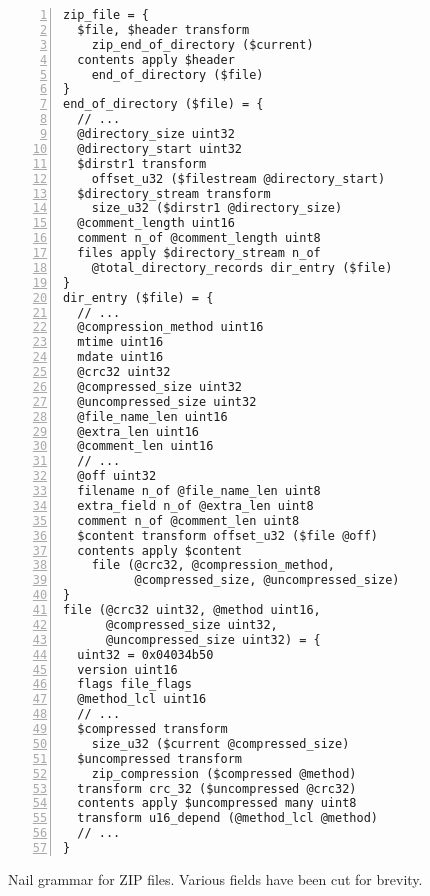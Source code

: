 \begin{figure}
\smaller[1.0]
\begin{Verbatim}[numbers=left, xleftmargin=3em]
zip_file = { 
  $file, $header transform 
    zip_end_of_directory ($current)
  contents apply $header
    end_of_directory ($file)
}
end_of_directory ($file) = {
  // ...
  @directory_size uint32 
  @directory_start uint32
  $dirstr1 transform
    offset_u32 ($filestream @directory_start)
  $directory_stream transform
    size_u32 ($dirstr1 @directory_size)
  @comment_length uint16
  comment n_of @comment_length uint8
  files apply $directory_stream n_of 
    @total_directory_records dir_entry ($file)
}
dir_entry ($file) = {
  // ...
  @compression_method uint16      
  mtime uint16
  mdate uint16
  @crc32 uint32
  @compressed_size uint32
  @uncompressed_size uint32
  @file_name_len uint16
  @extra_len uint16
  @comment_len uint16
  // ...
  @off uint32
  filename n_of @file_name_len uint8
  extra_field n_of @extra_len uint8
  comment n_of @comment_len uint8
  $content transform offset_u32 ($file @off)
  contents apply $content
    file (@crc32, @compression_method,
          @compressed_size, @uncompressed_size)
}
file (@crc32 uint32, @method uint16,
      @compressed_size uint32,
      @uncompressed_size uint32) = {
  uint32 = 0x04034b50
  version uint16
  flags file_flags
  @method_lcl uint16
  // ...
  $compressed transform
    size_u32 ($current @compressed_size)
  $uncompressed transform
    zip_compression ($compressed @method)
  transform crc_32 ($uncompressed @crc32)
  contents apply $uncompressed many uint8
  transform u16_depend (@method_lcl @method)
  // ...
}
\end{Verbatim}
\caption{Nail grammar for ZIP files. Various fields have been cut for brevity.}
\label{fig:zip-extract}
\end{figure}

